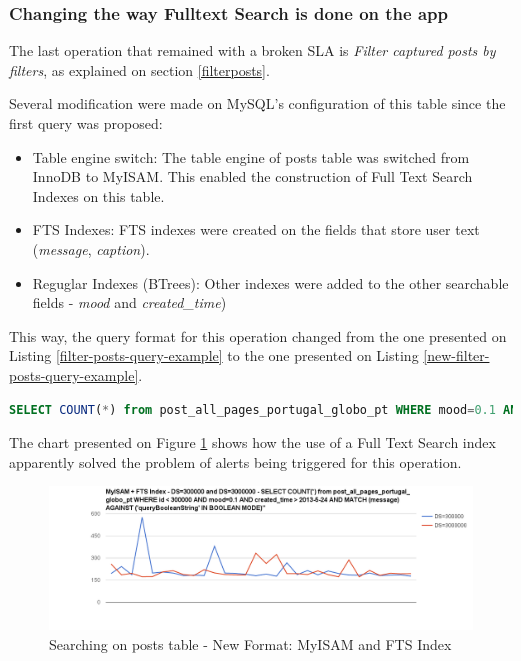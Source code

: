 \clearpage
\subsubsection{Changing the way Fulltext Search is done on the app}

The last operation that remained with a broken SLA is \textit{Filter captured posts by filters}, as explained on section \ref{filterposts}.

Several modification were made on MySQL's configuration of this table since the first query was proposed:
\begin{itemize}
\item{Table engine switch: The table engine of posts table was switched from InnoDB to MyISAM. This enabled the construction of Full Text Search Indexes on this table.}
\item{FTS Indexes: FTS indexes were created on the fields that store user text (\textit{message}, \textit{caption}).}
\item{Reguglar Indexes (BTrees): Other indexes were added to the other searchable fields - \textit{mood} and \textit{created\_time})}
\end{itemize}

This way, the query format for this operation changed from the one presented on Listing \ref{filter-posts-query-example} to the one presented on Listing \ref{new-filter-posts-query-example}.

\begin{lstlisting}[language=SQL,firstnumber=1, caption=New filter posts query format, label=new-filter-posts-query-example]
SELECT COUNT(*) from post_all_pages_portugal_globo_pt WHERE mood=0.1 AND created_time > 2013-5-24 AND MATCH (message) AGAINST ('booleanSearchString' IN BOOLEAN MODE)
\end{lstlisting} 

The chart presented on Figure \ref{fig:myISAM-FTSIndex} shows how the use of a Full Text Search index apparently solved the problem of alerts being triggered for this operation.  

\begin{figure}[ht!]
	\centering
	\includegraphics[width=150mm]{Imagens/myISAM-FTSIndex.png}
	\caption{Searching on posts table - New Format: MyISAM and FTS Index \label{fig:myISAM-FTSIndex}}
\end{figure}

